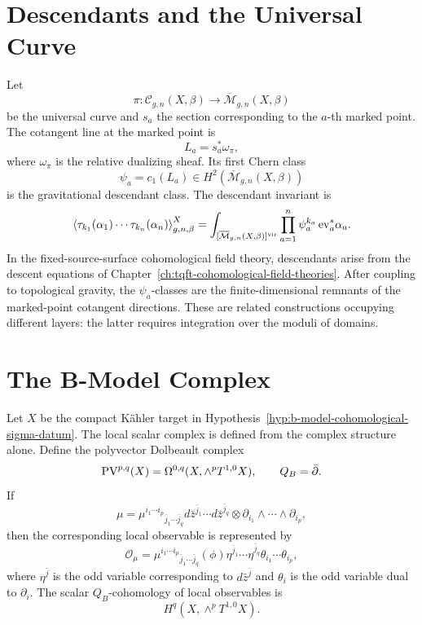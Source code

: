 \section{Descendants and the Universal Curve}

Let
\[
  \pi:\mathcal C_{g,n}(X,\beta)\to \overline{\mathcal M}_{g,n}(X,\beta)
\]
be the universal curve and \(s_a\) the section corresponding to the \(a\)-th
marked point.  The cotangent line at the marked point is
\[
  L_a=s_a^\ast\omega_\pi,
\]
where \(\omega_\pi\) is the relative dualizing sheaf.  Its first Chern class
\[
  \psi_a=c_1(L_a)
  \in H^2(\overline{\mathcal M}_{g,n}(X,\beta))
\]
is the gravitational descendant class.  The descendant invariant is
\[
  \left\langle
  \tau_{k_1}(\alpha_1)\cdots \tau_{k_n}(\alpha_n)
  \right\rangle_{g,n,\beta}^{X}
  =
  \int_{[\overline{\mathcal M}_{g,n}(X,\beta)]^{\rm vir}}
  \prod_{a=1}^n
  \psi_a^{k_a}\,{\rm ev}_a^\ast\alpha_a .
\]
In the fixed-source-surface cohomological field theory, descendants arise from
the descent equations of Chapter~\ref{ch:tqft-cohomological-field-theories}.
After coupling to topological gravity, the \(\psi_a\)-classes are the
finite-dimensional remnants of the marked-point cotangent directions.  These
are related constructions occupying different layers: the latter requires
integration over the moduli of domains.

\section{The B-Model Complex}

Let \(X\) be the compact K\"ahler target in
Hypothesis~\ref{hyp:b-model-cohomological-sigma-datum}.  The local scalar
complex is defined from the complex structure alone.  Define the polyvector
Dolbeault complex
\[
  {\rm PV}^{p,q}(X)
  =
  \Omega^{0,q}(X,\wedge^p T^{1,0}X),
  \qquad
  Q_B=\bar\partial .
\]
If
\[
  \mu
  =
  \mu^{i_1\cdots i_p}{}_{\bar j_1\cdots\bar j_q}
  d\bar z^{\bar j_1}\cdots d\bar z^{\bar j_q}
  \otimes
  \partial_{i_1}\wedge\cdots\wedge\partial_{i_p},
\]
then the corresponding local observable is represented by
\[
  \mathcal O_\mu
  =
  \mu^{i_1\cdots i_p}{}_{\bar j_1\cdots\bar j_q}(\phi)
  \eta^{\bar j_1}\cdots\eta^{\bar j_q}
  \theta_{i_1}\cdots\theta_{i_p},
\]
where \(\eta^{\bar j}\) is the odd variable corresponding to
\(d\bar z^{\bar j}\) and \(\theta_i\) is the odd variable dual to
\(\partial_i\).  The scalar \(Q_B\)-cohomology of local observables is
\[
  H^q(X,\wedge^pT^{1,0}X).
\]


